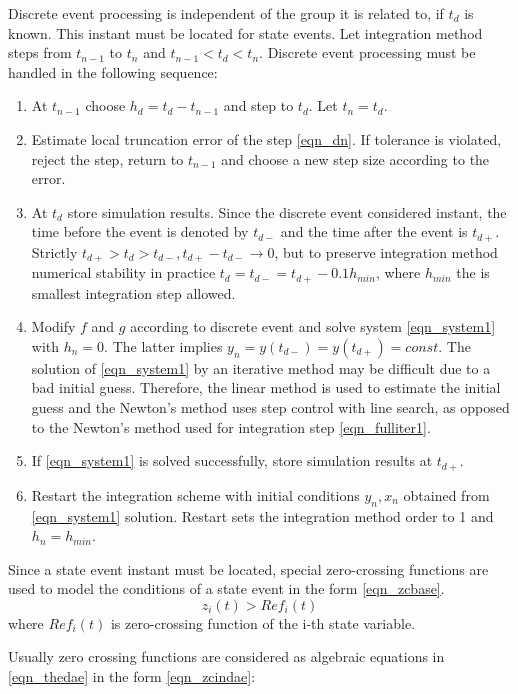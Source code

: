 \documentclass[lettersize,journal]{IEEEtran}
\begin{document}
Discrete event processing is independent of the group it is related to, if \(t_d\) is known. This instant must be located for state events. Let integration method steps from \(t_{n-1}\) to \(t_n\) and \(t_{n-1}<t_d<t_n\). Discrete event processing must be handled in the following sequence:
\begin{enumerate}
	\item At \(t_{n-1}\) choose \(h_d=t_d-t_{n-1}\) and step to \(t_d\). Let \(t_n=t_d\).
	\item Estimate local truncation error of the step \eqref{eqn_dn}. If tolerance is violated, reject the step, return to \(t_{n-1}\) and choose a new step size according to the error.
	\item At \(t_d\) store simulation results. Since the discrete event considered instant, the time before the event is denoted by \(t_{d-}\) and the time after the event is \(t_{d+}\). Strictly \(t_{d+}>t_d>t_{d-},  t_{d+}-t_{d-} \rightarrow 0\), but to preserve integration method numerical stability in practice \(t_d=t_{d-} = t_{d+}-0.1h_{min}\), where \(h_{min}\) the is smallest integration step allowed.
	\item Modify \(f\) and \(g\) according to discrete event and solve system \eqref{eqn_system1} with \(h_n=0\). The latter implies \(y_n=y(t_{d-})=y(t_{d+})=const\). The solution of \eqref{eqn_system1}  by an iterative method may be difficult due to a bad initial guess. Therefore, the linear method is used to estimate the initial guess and the Newton's method uses step control with line search, as opposed to the Newton's method used for integration step \eqref{eqn_fulliter1}.
	\item If \eqref{eqn_system1} is solved successfully, store simulation results at \(t_{d+}\).
	\item Restart the integration scheme with initial conditions \(y_n, x_n\) obtained from \eqref{eqn_system1} solution. Restart sets the integration method order to 1 and \(h_n=h_{min}\).
\end{enumerate}
Since a state event instant must be located, special zero-crossing functions are used to model the conditions of a state event in the form \eqref{eqn_zcbase}.
\begin{equation}
	\label{eqn_zcbase}
	z_i(t) > Ref_i(t)
\end{equation}
\noindent where \(Ref_i(t)\) is zero-crossing function of the i-th state variable.

Usually zero crossing functions are considered as algebraic equations in \eqref{eqn_thedae} in the form \eqref{eqn_zcindae}:
\end{document}
